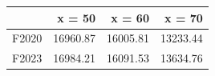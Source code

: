 \begin{tabular}{lrrr}
\toprule
 & x = 50 & x = 60 & x = 70 \\
\midrule
F2020 & 16960.87 & 16005.81 & 13233.44 \\
F2023 & 16984.21 & 16091.53 & 13634.76 \\
\bottomrule
\end{tabular}
